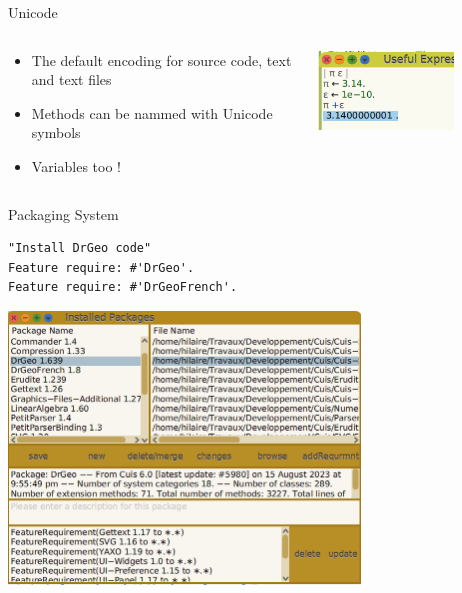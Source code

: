\documentclass{beamer}
\begin{document}
\begin{frame}{Unicode}
  \begin{columns}[c]
    \begin{column}{0.5\textwidth}
      \begin{itemize}
      \item The default encoding for source code, text and text files
      \item Methods can be nammed with Unicode symbols
      \item Variables too !
      \end{itemize}
    \end{column}
    \begin{column}{0.5\textwidth}
      \includegraphics[width=0.7\textwidth]{unicodeInCode.png}      
    \end{column}
  \end{columns}
\end{frame}
%
\begin{frame}[fragile]{Packaging System}
  \fontsize{8pt}{0pt}\selectfont
  \begin{lstlisting}[language=Smalltalk]
"Install DrGeo code"
Feature require: #'DrGeo'.
Feature require: #'DrGeoFrench'.
      \end{lstlisting}      
      \includegraphics[width=0.7\textwidth]{codePackager.png}       
\end{frame}
\end{document}
